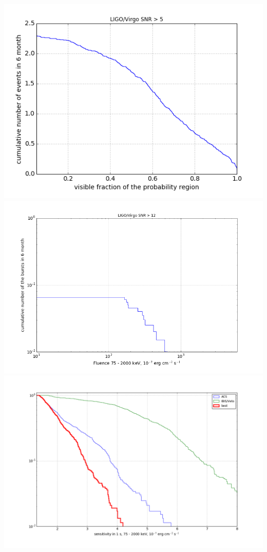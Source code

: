 \documentclass[a0,portrait]{a0poster}
\begin{document}
\begin{multicols}{2}
\begin{center}\vspace{.5cm}
    \includegraphics[scale=.6]{figures/covered_region.png}\includegraphics[scale=.45]{figures/fluence_distribution_12.png}\includegraphics[scale=.37]{figures/sensitivity_distribution_pe.png}

\end{center}
\end{multicols}
\end{document}

